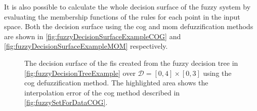 It is also possible to calculate the whole decision surface of the fuzzy system by evaluating the membership functions of the rules for each point in the input space. Both the decision surface using the \gls{cog} and \gls{mom} defuzzification methods are shown in \autoref{fig:fuzzyDecisionSurfaceExampleCOG} and \autoref{fig:fuzzyDecisionSurfaceExampleMOM} respectively.

\begin{multicols}{2}
    \begin{figure}[H]
        \centering

        \caption[Decision surface of the fuzzy rules using COG method]{The decision surface of the \gls{fis} created from the fuzzy decision tree in \autoref{fig:fuzzyDecisionTreeExample} over $\mathcal{D}=[0,4]\times[0,3]$ using the \gls{cog} defuzzification method. The highlighted area shows the interpolation error of the \gls{cog} method described in \autoref{fig:fuzzySetForDataCOG}.}
        \label{fig:fuzzyDecisionSurfaceExampleCOG}
    \end{figure}


\end{multicols}
